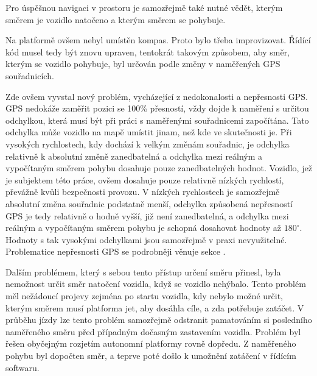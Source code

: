 \documentclass[czech, bachelor]{diploma}
\begin{document}
Pro úspěšnou navigaci v prostoru je samozřejmě také nutné vědět, kterým směrem je vozidlo natočeno a kterým směrem se pohybuje.

Na platformě ovšem nebyl umístěn kompas. Proto bylo třeba improvizovat. Řídící kód musel tedy být znovu upraven, tentokrát takovým
způsobem, aby směr, kterým se vozidlo pohybuje, byl určován podle změny v naměřených GPS souřadnicích.

Zde ovšem vyvstal nový problém, vycházející z nedokonalosti a nepřesnosti GPS. GPS nedokáže zaměřit pozici se 100\% přesností,
vždy dojde k naměření s určitou odchylkou, která musí být při práci s naměřenými souřadnicemi započítána. Tato odchylka může
vozidlo na mapě umístit jinam, než kde ve skutečnosti je. Při vysokých rychlostech, kdy dochází k velkým změnám souřadnic,
je odchylka relativně k absolutní změně zanedbatelná a odchylka mezi reálným a vypočítaným směrem pohybu dosahuje pouze
zanedbatelných hodnot. Vozidlo, jež je subjektem této práce, ovšem dosahuje pouze relativně nízkých rychlostí, převážně kvůli
bezpečnosti provozu. V nízkých rychlostech je samozřejmě absolutní změna souřadnic podstatně menší, odchylka způsobená nepřesností
GPS je tedy relativně o hodně vyšší, již není zanedbatelná, a odchylka mezi reálným a vypočítaným směrem pohybu je schopná
dosahovat hodnoty až $180^{\circ}$. Hodnoty s tak vysokými odchylkami jsou samozřejmě v praxi nevyužitelné. Problematice
nepřesnosti GPS se podrobněji věnuje sekce .

Dalším problémem, který s sebou tento přístup určení směru přinesl, byla nemožnost určit směr natočení vozidla, když se vozidlo
nehýbalo. Tento problém měl nežádoucí projevy zejména po startu vozidla, kdy nebylo možné určit, kterým směrem musí platforma jet,
aby dosáhla cíle, a zda potřebuje zatáčet. V průběhu jízdy lze tento problém samozřejmě odstranit pamatováním si posledního
naměřeného směru před případným dočasným zastavením vozidla. Problém byl řešen obyčejným rozjetím autonomní platformy rovně
dopředu. Z naměřeného pohybu byl dopočten směr, a teprve poté došlo k umožnění zatáčení v řídícím softwaru.
\end{document}
